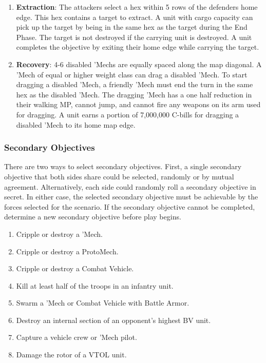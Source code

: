 \documentclass{article}
\begin{document}
\begin{enumerate}
\item {\bfseries Extraction}: The attackers select a hex within 5 rows of the defenders home edge.
This hex contains a target to extract.
A unit with cargo capacity can pick up the target by being in the same hex as the target during the End Phase.
The target is not destroyed if the carrying unit is destroyed.
A unit completes the objective by exiting their home edge while carrying the target.

\item {\bfseries Recovery}: 4-6 disabled 'Mechs are equally spaced along the map diagonal.
A 'Mech of equal or higher weight class can drag a disabled 'Mech.
To start dragging a disabled 'Mech, a friendly 'Mech must end the turn in the same hex as the disabled 'Mech.
The dragging 'Mech has a one half reduction in their walking MP, cannot jump, and cannot fire any weapons on its arm used for dragging.
A unit earns a portion of 7,000,000 C-bills for dragging a disabled 'Mech to its home map edge.

\end{enumerate}

\newpage

\subsubsection{Secondary Objectives}

There are two ways to select secondary objectives.
First, a single secondary objective that both sides share could be selected, randomly or by mutual agreement.
Alternatively, each side could randomly roll a secondary objective in secret.
In either case, the selected secondary objective must be achievable by the forces selected for the scenario.
If the secondary objective cannot be completed, determine a new secondary objective before play begins.

\begin{enumerate}

\item Cripple or destroy a 'Mech.

\item Cripple or destroy a ProtoMech.

\item Cripple or destroy a Combat Vehicle.

\item Kill at least half of the troops in an infantry unit.

\item Swarm a 'Mech or Combat Vehicle with Battle Armor.

\item Destroy an internal section of an opponent's highest BV unit.

\item Capture a vehicle crew or 'Mech pilot.

\item Damage the rotor of a VTOL unit.

\end{enumerate}
\end{document}
